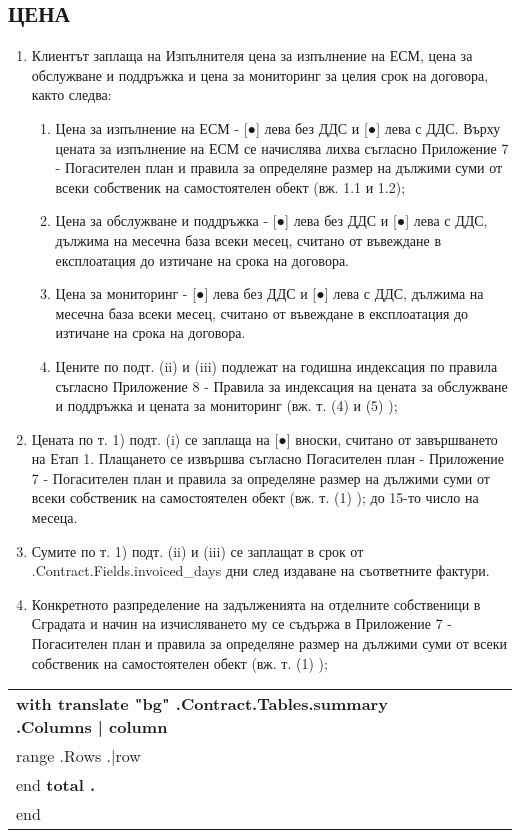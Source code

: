 \subsection{ЦЕНА}
\begin{enumerate}
\item Клиентът заплаща на Изпълнителя цена за изпълнение на ЕСМ, цена
  за обслужване и поддръжка и цена за мониторинг за целия срок на
  договора, както следва:
  \begin{enumerate}
  \item Цена за изпълнение на ЕСМ {-} [●] лева без ДДС и [●] лева с
    ДДС. Върху цената за изпълнение на ЕСМ се начислява лихва съгласно
    Приложение 7 {-} Погасителен план и правила за определяне размер на
    дължими суми от всеки собственик на самостоятелен обект
    (вж. 1.1 и 1.2);
  \item Цена за обслужване и поддръжка {-} [●] лева без ДДС и [●] лева с
    ДДС, дължима на месечна база всеки месец, считано от въвеждане в
    експлоатация до изтичане на срока на договора.
  \item Цена за мониторинг {-} [●] лева без ДДС и [●] лева с ДДС,
    дължима на месечна база всеки месец, считано от въвеждане в
    експлоатация до изтичане на срока на договора.
  \item Цените по подт. (ii) и (iii) подлежат на годишна индексация по
    правила съгласно Приложение 8 {-} Правила за индексация на цената за
    обслужване и поддръжка и цената за мониторинг (вж. т. (4) и (5) );
  \end{enumerate}
\item Цената по т. 1) подт. (i) се заплаща на [●] вноски, считано от
  завършването на Етап 1. Плащането се извършва съгласно Погасителен
  план {-} Приложение 7 {-} Погасителен план и правила за определяне
  размер на дължими суми от всеки собственик на самостоятелен обект
  (вж. т. (1) ); до 15-то число на месеца.
\item Сумите по т. 1) подт. (ii) и (iii) се заплащат в срок от {{.Contract.Fields.invoiced_days}} дни
  след издаване на съответните фактури.
\item Конкретното разпределение на задълженията на отделните
  собственици в Сградата и начин на изчисляването му се съдържа в
  Приложение 7 {-} Погасителен план и правила за определяне размер на
  дължими суми от всеки собственик на самостоятелен обект
  (вж. т. (1) );
\end{enumerate}

\begin{center}
	\begin{tabu}{|X|X|X|X|}\tabucline{}\rowfont[c]\bfseries
	{{with translate "bg" .Contract.Tables.summary}} %
	{{.Columns | column}} \\\tabucline{}
	{{range .Rows}} %
	{{.|row}} \\\tabucline{}
	{{end}}
	\bfseries {{total .}} \\\tabucline{} %
	{{end}}
	\end{tabu}
\end{center}

